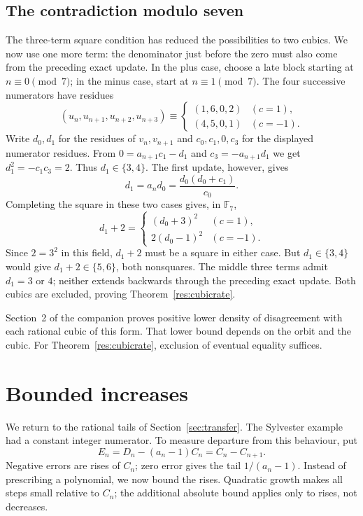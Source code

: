 \documentclass[11pt]{article}
\begin{document}
\subsection{The contradiction modulo seven}\label{sec:cubic-mod-seven}
The three-term square condition has reduced the possibilities to two
cubics. We now use one more term: the denominator just before the zero
must also come from the preceding exact update.
In the plus case, choose a late block starting at $n\equiv0\pmod7$;
in the minus case, start at $n\equiv1\pmod7$. The four successive
numerators have residues
\[
 (u_n,u_{n+1},u_{n+2},u_{n+3})\equiv
 \begin{cases}(1,6,0,2)&(c=1),\\(4,5,0,1)&(c=-1).
 \end{cases}
\]
Write $d_0,d_1$ for the residues of $v_n,v_{n+1}$ and
$c_0,c_1,0,c_3$ for the displayed numerator residues. From
$0=a_{n+1}c_1-d_1$ and $c_3=-a_{n+1}d_1$ we get
$d_1^2=-c_1c_3=2$. Thus $d_1\in\{3,4\}$.
The first update, however, gives
\[
 d_1=a_nd_0=\frac{d_0(d_0+c_1)}{c_0}.
\]
Completing the square in these two cases gives, in $\mathbb F_7$,
\[
 d_1+2=
 \begin{cases}
 (d_0+3)^2 &(c=1),\\
 2(d_0-1)^2 &(c=-1).
 \end{cases}
\]
Since $2=3^2$ in this field, $d_1+2$ must be a square in either case.
But $d_1\in\{3,4\}$ would give $d_1+2\in\{5,6\}$, both nonsquares.
The middle three terms admit $d_1=3$ or $4$; neither extends
backwards through the preceding exact update. Both cubics are excluded,
proving Theorem~\ref{res:cubicrate}.

Section~2 of the companion proves positive lower density of
disagreement with each rational cubic of this form. That lower bound
depends on the orbit and the cubic. For Theorem~\ref{res:cubicrate},
exclusion of eventual equality suffices.
\section{Bounded increases}\label{sec:bounded}
We return to the rational tails of Section~\ref{sec:transfer}.
The Sylvester example had a constant integer numerator. To measure
departure from this behaviour, put
\[
 E_n=D_n-(a_n-1)C_n=C_n-C_{n+1}.
\]
Negative errors are rises of $C_n$; zero error gives the tail
$1/(a_n-1)$. Instead of prescribing a polynomial, we now bound the
rises. Quadratic growth makes all steps small relative to $C_n$;
the additional absolute bound applies only to rises, not decreases.
\end{document}
